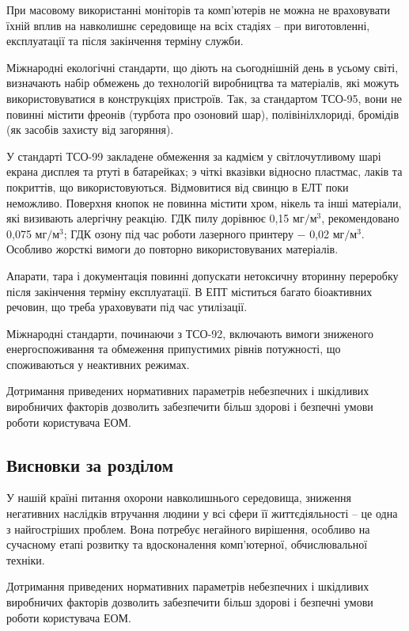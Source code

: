 При масовому використанні моніторів та комп’ютерів не можна не враховувати їхній вплив на навколишнє середовище на всіх стадіях – при виготовленні, експлуатації та після закінчення терміну служби.

Міжнародні екологічні стандарти, що діють на сьогоднішній день в усьому світі, визначають набір обмежень до технологій виробництва та матеріалів, які можуть використовуватися в конструкціях пристроїв. Так, за стандартом ТСО-95, вони не повинні містити фреонів (турбота про озоновий шар), полівінілхлориді, бромідів (як засобів захисту від загоряння).

У стандарті ТСО-99 закладене обмеження за кадмієм у світлочутливому шарі екрана дисплея та ртуті в батарейках; э чіткі вказівки відносно пластмас, лаків та покриттів, що використовуються. Відмовитися від свинцю в ЕЛТ поки неможливо. Поверхня кнопок не повинна містити хром, нікель та інші матеріали, які визивають алергічну реакцію. ГДК пилу дорівнює 0,15 $\text{мг}/\text{м}^{3}$, рекомендовано 0,075 $\text{мг}/\text{м}^{3}$; ГДК озону під час роботи лазерного принтеру $-$ 0,02 $\text{мг}/\text{м}^{3}$. Особливо жорсткі вимоги до повторно використовуваних матеріалів. 

Апарати, тара і документація повинні допускати нетоксичну вторинну переробку після закінчення терміну експлуатації. В ЕПТ міститься багато біоактивних речовин, що треба ураховувати під час утилізації.

Міжнародні стандарти, починаючи з ТСО-92, включають вимоги зниженого енергоспоживання та обмеження припустимих рівнів потужності, що споживаються у неактивних режимах.

Дотримання приведених нормативних параметрів небезпечних і шкідливих виробничих факторів дозволить забезпечити більш здорові і безпечні умови роботи користувача ЕОМ.
\newpage
\subsection{Висновки за розділом}

У нашій країні питання охорони навколишнього середовища, зниження негативних наслідків втручання людини у всі сфери її життєдіяльності –  це одна з найгостріших проблем. Вона потребує негайного вирішення, особливо на сучасному етапі розвитку та вдосконалення комп’ютерної, обчислювальної техніки.

Дотримання приведених нормативних параметрів небезпечних і шкідливих виробничих факторів дозволить забезпечити більш здорові і безпечні умови роботи користувача ЕОМ.

